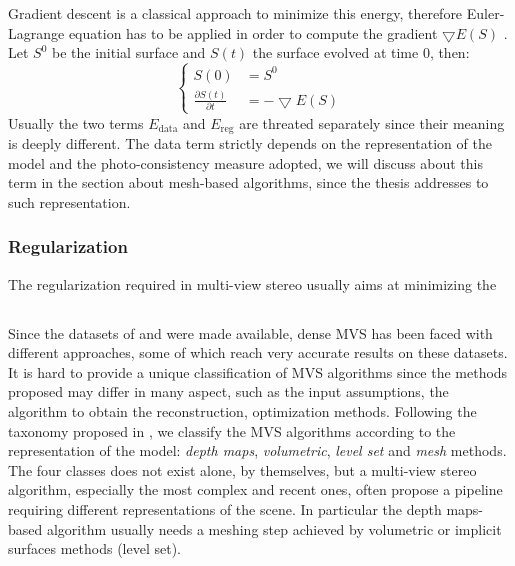 Gradient descent is a classical approach to minimize this energy, therefore Euler-Lagrange equation has to be applied in order to compute the gradient $\bigtriangledown E(\mathit{S})$ \cite{hermosillo2002variational}. Let $\mathit{S}^0$ be the initial surface and $\mathit{S}(t)$ the surface evolved at time $0$, then:
\begin{equation}
 \begin{cases}
  \mathit{S}(0) &=\mathit{S}^0\\
  \frac{\partial \mathit{S}(t)}{\partial t} & = -\bigtriangledown E(\mathit{S})
 \end{cases}
\end{equation}
Usually the two terms $E_{\text{data}}$ and $E_{\text{reg}}$ are threated separately since their meaning is deeply different.
The data term strictly depends on the representation of the model and the photo-consistency measure adopted, we will discuss about this term in the section about mesh-based algorithms, since the thesis addresses to such representation.

\subsubsection{Regularization}
The regularization required in multi-view stereo usually aims at minimizing the 

\subsection{}
Since the datasets of \cite{Seitz_et_al06} and \cite{strecha2008} were made available, dense MVS has been faced with different approaches, some of which reach very accurate results on these datasets.
It is hard to provide a unique classification of MVS algorithms since the methods proposed may differ in many aspect, such as the input assumptions, the algorithm to obtain the reconstruction, optimization methods. Following the taxonomy proposed in \cite{Seitz_et_al06}, we classify the MVS algorithms according to the representation of the model: \emph{depth maps}, \emph{volumetric},  \emph{level set} and \emph{mesh} methods. The four classes does not exist alone, by themselves, but a multi-view stereo algorithm, especially the most complex and recent ones, often propose a pipeline requiring different representations of the scene. In particular the depth maps-based algorithm usually needs a meshing step achieved by volumetric or implicit surfaces methods (level set).


